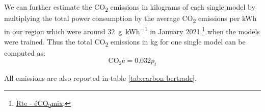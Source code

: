 We can further estimate the CO\textsubscript{2} emissions in kilograms of each single model by multiplying the total power consumption by the average CO\textsubscript{2} emissions per \unit{\kWh} in our region which were around \qty{32}{\gram\per\kWh} in January 2021,\footnote{\href{https://www.rte-france.com/eco2mix/les-emissions-de-co2-par-kwh-produit-en-france}{Rte - éCO\textsubscript{2}mix}.} when the models were trained. Thus the total CO\textsubscript{2} emissions in kg for one single model can be computed as:
\begin{equation*}
    \text{CO}_{2}\text{e} = 0.032 p_t
\end{equation*}

All emissions are also reported in table \ref{tab:carbon-bertrade}.